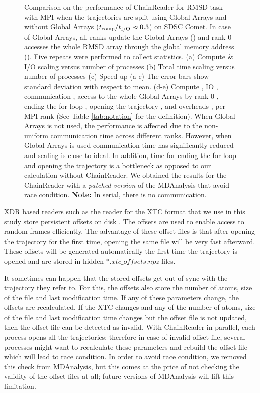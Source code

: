 \begin{figure}[ht!]
\caption{Comparison on the performance of ChainReader for RMSD task with MPI when the trajectories are split using Global Arrays and without Global Arrays (${t}_{\text{comp}}/{t}_{\text{I/O}} \approx 0.3$) on SDSC Comet.
In case of Global Arrays, all ranks update the Global Arrays () and rank 0 accesses the whole RMSD array through the global memory address ().
Five repeats were performed to collect statistics. (a) Compute \& I/O scaling versus number of processes (b) Total time scaling versus number of processes (c) Speed-up (a-c) The error bars show standard deviation with respect to mean. (d-e) Compute \tcomp, IO \tIO, communication \tcomm, access to the whole Global Arrays by rank 0 , ending the for loop ,
  opening the trajectory , and overheads ,  per MPI rank (See Table \ref{tab:notation} for the definition). When Global Arrays is not used, the performance is affected due to the non-uniform communication time across different ranks. However, when Global Arrays is used communication time has significantly reduced and scaling is close to ideal. In addition, time for ending the for loop  and 
opening the trajectory  is a bottleneck as opposed to our calculation without ChainReader. We obtained the results for the ChainReader with a \emph{patched version} of the MDAnalysis that avoid race condition. \textbf{Note:} In serial, there is no communication.}
\label{fig:MPIwithIO-split-chain-reader}
\end{figure}

XDR based readers such as the reader for the XTC format that we use in this study store persistent offsets on disk \citep{Gowers:2016aa}. 
The offsets are used to enable access to random frames efficiently. 
The advantage of these offset files is that after opening the trajectory for the first time, opening the same file will be very fast afterward. 
These offsets will be generated automatically the first time the trajectory is opened and are stored in hidden $\ast.xtc\_offsets.npz$ files. 

It sometimes can happen that the stored offsets get out of sync with the trajectory they refer to. 
For this, the offsets also store the number of atoms, size of the file and last modification time. 
If any of these parameters change, the offsets are recalculated. 
If the XTC changes and any of the number of atoms, size of the file and last modification time changes but the offset file is not updated, then the offset file can be detected as invalid.
With ChainReader in parallel, each process opens all the trajectories; therefore in case of invalid offset file, several processes might want to recalculate these parameters and rebuild the offset file which will lead to race condition.
In order to avoid race condition, we removed this check from MDAnalysis, but this comes at the price of not checking the validity of the offset files at all; future versions of MDAnalysis will lift this limitation.
 
